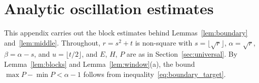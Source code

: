 \documentclass{birkjour}
\theoremstyle{definition}
\theoremstyle{remark}
\newcommand{\fl}[1]{\lfloor #1 \rfloor}
\begin{document}

\appendix

\section{Analytic oscillation estimates}
\label{app:analytic}

This appendix carries out the block estimates behind
Lemmas~\ref{lem:boundary} and~\ref{lem:middle}. Throughout,
$r=s^{2}+t$ is non-square with $s=\fl{\sqrt{r}}$,
$\alpha=\sqrt{r}$, $\beta=\alpha-s$, and $u=\fl{t/2}$, and
$E$, $H$, $P$ are as in Section~\ref{sec:universal}. By
Lemma~\ref{lem:blocks} and Lemma~\ref{lem:window}(a), the
bound $\max P-\min P<\alpha-1$ follows from
inequality~\eqref{eq:boundary_target}.
\end{document}
